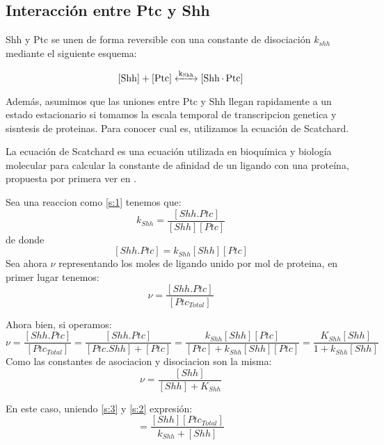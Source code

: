  \subsection{Interacción entre Ptc y Shh}
 Shh y Ptc se unen de forma reversible con una constante de disociación $k_{shh}$ mediante el siguiente esquema: 
 
\begin{equation}
\ce{[Shh] + [Ptc] <->[k_{Shh}] [Shh.Ptc] }
\label{s:1}
\end{equation}
 
 Además, asumimos que las uniones entre Ptc y Shh llegan rapidamente a un estado estacionario si tomamos la escala temporal de transcripcion genetica y sisntesis de proteinas. Para conocer cual es, utilizamos la ecuación de Scatchard.
 
 La ecuación de Scatchard es una ecuación utilizada en bioquímica y biología molecular para calcular la constante de afinidad de un ligando con una proteína, propuesta por primera ver en \cite{scatchard1949attractions}. 
 
 Sea una reaccion como \ref{s:1} tenemos que: 
 $$k_{Shh}=\frac{[Shh.Ptc]}{[Shh][Ptc]}$$
 de donde 
 $$[Shh.Ptc]=k_{Shh}[Shh][Ptc]$$
 Sea ahora $\nu$ representando los moles de ligando unido por mol de proteina, en primer lugar tenemos:
 \begin{equation}
 \nu=\frac{[Shh.Ptc]}{[Ptc_{Total}]}
 \label{s:2}
 \end{equation}
 
 Ahora bien, si operamos:
 $$\nu=\frac{[Shh.Ptc]}{[Ptc_{Total}]}=\frac{[Shh.Ptc]}{[Ptc.Shh]+[Ptc]}=\frac{k_{Shh}[Shh][Ptc]}{[Ptc]+k_{Shh}[Shh][Ptc]}=\frac{K_{Shh}[Shh]}{1+k_{Shh}[Shh]}$$
 Como las constantes de asociacion y disociacion son la misma: \begin{equation}
 \nu=\frac{[Shh]}{[Shh]+K_{Shh}}
 \label{s:3}
 \end{equation}
 
 En este caso, uniendo \ref{s:3} y \ref{s:2} expresión: 
 \begin{equation}
 [Shh.Ptc]=\frac{[Shh][Ptc_{Total}]}{k_{Shh}+[Shh]}
 \label{s:6}
 \end{equation}
 
